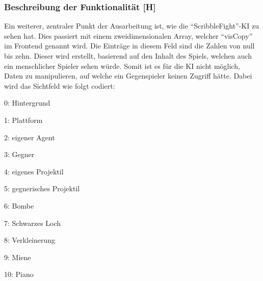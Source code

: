 \subsubsection{Beschreibung der Funktionalität [H]}
Ein weiterer, zentraler Punkt der Ausarbeitung ist, wie die ``ScribbleFight''-KI zu sehen hat. Dies passiert mit einem zweidimensionalen Array, welcher ``visCopy'' im Frontend genannt wird. Die Einträge in diesem Feld sind die Zahlen von null bis zehn. Dieser wird erstellt, basierend auf den Inhalt des Spiels, welchen auch ein menschlicher Spieler sehen würde. Somit ist es für die KI nicht möglich, Daten zu manipulieren, auf welche ein Gegenspieler keinen Zugriff hätte. Dabei wird das Sichtfeld wie folgt codiert:
\begin{compactitem}\label{mappedPixels}
  \item 0: Hintergrund
  \item 1: Plattform
  \item 2: eigener Agent
  \item 3: Gegner
  \item 4: eigenes Projektil
  \item 5: gegnerisches Projektil
  \item 6: Bombe
  \item 7: Schwarzes Loch
  \item 8: Verkleinerung
  \item 9: Miene
  \item 10: Piano
\end{compactitem}

